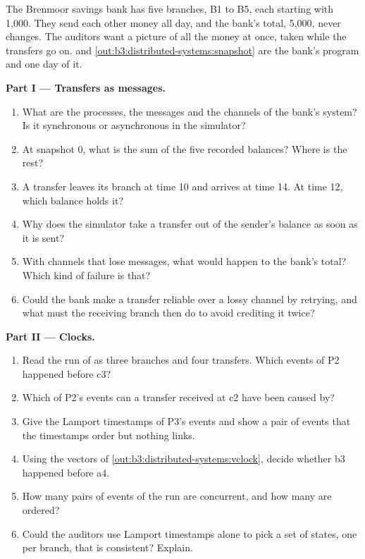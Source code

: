 \begin{problem}\label{pb:b3:distributed-systems:1}
The Brenmoor savings bank has five branches, B1 to B5, each starting with 1,000. They send each other money all day, and the bank's total, 5,000, never changes. The auditors want a picture of all the money at once, taken while the transfers go on.  and \cref{out:b3:distributed-systems:snapshot} are the bank's program and one day of it.

\medskip\noindent\textbf{Part I --- Transfers as messages.}
\begin{enumerate}
  \item What are the processes, the messages and the channels of the bank's system? Is it synchronous or asynchronous in the simulator?
  \item At snapshot 0, what is the sum of the five recorded balances? Where is the rest?
  \item A transfer leaves its branch at time 10 and arrives at time 14. At time 12, which balance holds it?
  \item Why does the simulator take a transfer out of the sender's balance as soon as it is sent?
  \item With channels that lose messages, what would happen to the bank's total? Which kind of failure is that?
  \item Could the bank make a transfer reliable over a lossy channel by retrying, and what must the receiving branch then do to avoid crediting it twice?
\end{enumerate}

\medskip\noindent\textbf{Part II --- Clocks.}
\begin{enumerate}[resume]
  \item Read the run of  as three branches and four transfers. Which events of P2 happened before c3?
  \item Which of P2's events can a transfer received at c2 have been caused by?
  \item Give the Lamport timestamps of P3's events and show a pair of events that the timestamps order but nothing links.
  \item Using the vectors of \cref{out:b3:distributed-systems:vclock}, decide whether b3 happened before a4.
  \item How many pairs of events of the run are concurrent, and how many are ordered?
  \item Could the auditors use Lamport timestamps alone to pick a set of states, one per branch, that is consistent? Explain.
\end{enumerate}


\end{problem}
